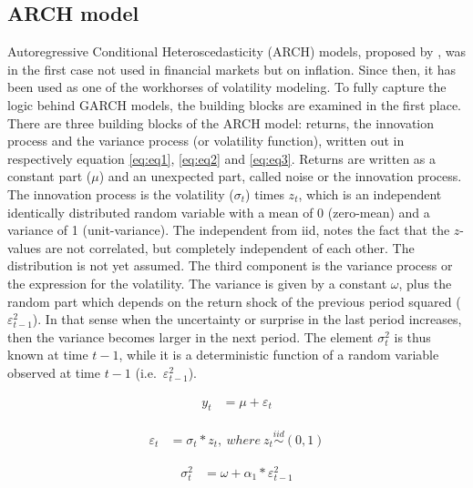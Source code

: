 \documentclass[a4paper, twoside]{templates/ociamthesis}
\begin{document}
\hypertarget{arch-model}{%
\subsection{ARCH model}\label{arch-model}}

\noindent Autoregressive Conditional Heteroscedasticity (ARCH) models, proposed by \textcite{engle1982}, was in the first case not used in financial markets but on inflation. Since then, it has been used as one of the workhorses of volatility modeling. To fully capture the logic behind GARCH models, the building blocks are examined in the first place. There are three building blocks of the ARCH model: returns, the innovation process and the variance process (or volatility function), written out in respectively equation \eqref{eq:eq1}, \eqref{eq:eq2} and \eqref{eq:eq3}. Returns are written as a constant part (\(\mu\)) and an unexpected part, called noise or the innovation process. The innovation process is the volatility (\(\sigma_t\)) times \(z_t\), which is an independent identically distributed random variable with a mean of 0 (zero-mean) and a variance of 1 (unit-variance). The independent from iid, notes the fact that the \(z\)-values are not correlated, but completely independent of each other. The distribution is not yet assumed. The third component is the variance process or the expression for the volatility. The variance is given by a constant \(\omega\), plus the random part which depends on the return shock of the previous period squared (\(\varepsilon_{t-1}^2\)). In that sense when the uncertainty or surprise in the last period increases, then the variance becomes larger in the next period. The element \(\sigma_t^2\) is thus known at time \(t-1\), while it is a deterministic function of a random variable observed at time \(t-1\) (i.e.~\(\varepsilon_{t-1}^2\)).

\begin{align} 
y_{t} &= \mu + \varepsilon_t
 \label{eq:eq1}
\end{align}

\begin{align} 
\varepsilon_{t} &= \sigma_t * z_t, \ where \ z_t \stackrel{iid}{\sim} (0,1)
 \label{eq:eq2}
\end{align} 

\begin{align} 
\sigma_{t}^{2} &= \omega + \alpha_1 *  \varepsilon_{t-1}^2 
 \label{eq:eq3}
\end{align}

\newpage
\end{document}
